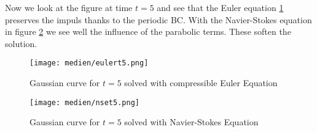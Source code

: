 \documentclass[11pt]{scrartcl}
\begin{document}
 Now we look at the figure at time $t = 5$ and see that the Euler equation \ref{gaus_euler_t5} preserves the impuls thanks to the periodic BC. With the Navier-Stokes equation in figure \ref{gaus_nse_t5} we see well the influence of the parabolic terms. These soften the solution.
 \begin{figure}[H]
 	\centering
 	\texttt{[image: medien/eulert5.png]}
 	\label{gaus_euler_t5}
 	\caption{Gaussian curve for $t=5$ solved with compressible Euler Equation}
 \end{figure}

 \begin{figure}[H]
	\centering
	\texttt{[image: medien/nset5.png]}
	\label{gaus_nse_t5}
	\caption{Gaussian curve for $t=5$ solved with Navier-Stokes Equation}
\end{figure}




\newpage
{}


\end{document}
